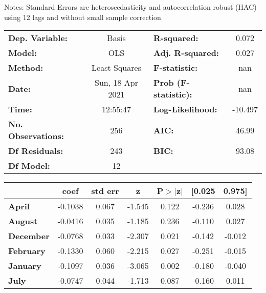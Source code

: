 Notes: \newline
 [1] Standard Errors are heteroscedasticity and autocorrelation robust (HAC) using 12 lags and without small sample correction
\begin{center}
\begin{tabular}{lclc}
\toprule
\textbf{Dep. Variable:}    &      Basis       & \textbf{  R-squared:         } &     0.072   \\
\textbf{Model:}            &       OLS        & \textbf{  Adj. R-squared:    } &     0.027   \\
\textbf{Method:}           &  Least Squares   & \textbf{  F-statistic:       } &       nan   \\
\textbf{Date:}             & Sun, 18 Apr 2021 & \textbf{  Prob (F-statistic):} &      nan    \\
\textbf{Time:}             &     12:55:47     & \textbf{  Log-Likelihood:    } &   -10.497   \\
\textbf{No. Observations:} &         256      & \textbf{  AIC:               } &     46.99   \\
\textbf{Df Residuals:}     &         243      & \textbf{  BIC:               } &     93.08   \\
\textbf{Df Model:}         &          12      & \textbf{                     } &             \\
\bottomrule
\end{tabular}
\begin{tabular}{lcccccc}
                   & \textbf{coef} & \textbf{std err} & \textbf{z} & \textbf{P$> |$z$|$} & \textbf{[0.025} & \textbf{0.975]}  \\
\midrule
\textbf{April}     &      -0.1038  &        0.067     &    -1.545  &         0.122        &       -0.236    &        0.028     \\
\textbf{August}    &      -0.0416  &        0.035     &    -1.185  &         0.236        &       -0.110    &        0.027     \\
\textbf{December}  &      -0.0768  &        0.033     &    -2.307  &         0.021        &       -0.142    &       -0.012     \\
\textbf{February}  &      -0.1330  &        0.060     &    -2.215  &         0.027        &       -0.251    &       -0.015     \\
\textbf{January}   &      -0.1097  &        0.036     &    -3.065  &         0.002        &       -0.180    &       -0.040     \\
\textbf{July}      &      -0.0747  &        0.044     &    -1.713  &         0.087        &       -0.160    &        0.011     \\

\end{tabular}
\end{center}
